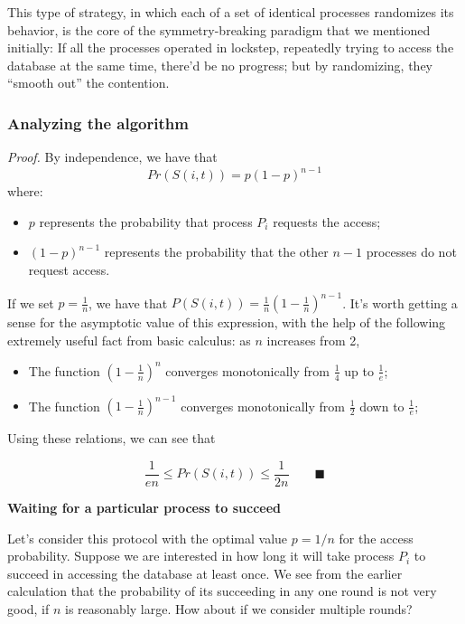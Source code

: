 This type of strategy, in which each of a set of identical processes randomizes its behavior, is the core of the symmetry-breaking paradigm that we mentioned initially: If all the processes operated in lockstep, repeatedly trying to access the database at the same time, there’d be no progress; but by randomizing, they “smooth out” the contention.

\subsubsection{Analyzing the algorithm}

\textit{Proof.} By independence, we have that 
$$
Pr(S(i,t)) = p(1-p)^{n-1}
$$
where:
\begin{itemize}
    \item $p$ represents the probability that process $P_i$ requests the access;
    \item $(1-p)^{n-1}$ represents the probability that the other $n-1$ processes do not request access.
\end{itemize}

If we set $p = \frac{1}{n}$, we have that $P(S(i,t)) = \frac{1}{n} \left( 1 - \frac{1}{n} \right)^{n-1}$. It’s worth getting a sense for the asymptotic value of this expression, with the help of the following extremely useful fact from basic calculus: as $n$ increases from 2,

\begin{itemize}
    \item The function $\left( 1 - \frac{1}{n} \right)^n$ converges monotonically from $\frac{1}{4}$ up to $\frac{1}{e}$;
    \item The function $\left( 1 - \frac{1}{n} \right)^{n-1}$ converges monotonically from $\frac{1}{2}$ down to $\frac{1}{e}$;
\end{itemize}

Using these relations, we can see that

$$
\frac{1}{en} \leq Pr(S(i,t)) \leq \frac{1}{2n} \qquad \blacksquare
$$

\textbf{Waiting for a particular process to succeed}

Let’s consider this protocol with the optimal value $p = 1/n$ for the access probability. Suppose we are interested in how long it will take process $P_i$ to succeed in accessing the database at least once. We see from the earlier calculation that the probability of its succeeding in any one round is not very good, if $n$ is reasonably large. How about if we consider multiple rounds?

